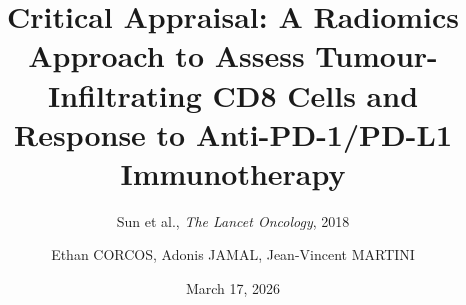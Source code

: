 \documentclass[aspectratio=1610]{beamer}
\title[Radiomics \& Immunotherapy]{Critical Appraisal: A Radiomics Approach to Assess Tumour-Infiltrating CD8 Cells and Response to Anti-PD-1/PD-L1 Immunotherapy}
\subtitle{Sun et al., \textit{The Lancet Oncology}, 2018}
\author[CORCOS, JAMAL, MARTINI]{Ethan CORCOS, Adonis JAMAL, Jean-Vincent MARTINI}
\institute[]{MVA \& MSV - Biostatistics}
\date{March 17, 2026}
\begin{document}
\frame{\titlepage}


\end{document}
